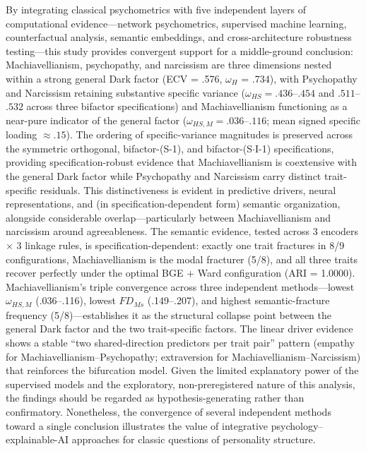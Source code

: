 \documentclass[11pt,twocolumn]{article}
\begin{document}
By integrating classical psychometrics with five independent layers of computational evidence---network psychometrics, supervised machine learning, counterfactual analysis, semantic embeddings, and cross-architecture robustness testing---this study provides convergent support for a middle-ground conclusion: Machiavellianism, psychopathy, and narcissism are three dimensions nested within a strong general Dark factor (ECV = .576, $\omega_H$ = .734), with Psychopathy and Narcissism retaining substantive specific variance ($\omega_{HS} = .436$--$.454$ and $.511$--$.532$ across three bifactor specifications) and Machiavellianism functioning as a near-pure indicator of the general factor ($\omega_{HS,M} = .036$--$.116$; mean signed specific loading $\approx .15$). The ordering of specific-variance magnitudes is preserved across the symmetric orthogonal, bifactor-(S-1), and bifactor-(S$\cdot$I-1) specifications, providing specification-robust evidence that Machiavellianism is coextensive with the general Dark factor while Psychopathy and Narcissism carry distinct trait-specific residuals. This distinctiveness is evident in predictive drivers, neural representations, and (in specification-dependent form) semantic organization, alongside considerable overlap---particularly between Machiavellianism and narcissism around agreeableness. The semantic evidence, tested across 3 encoders $\times$ 3 linkage rules, is specification-dependent: exactly one trait fractures in 8/9 configurations, Machiavellianism is the modal fracturer (5/8), and all three traits recover perfectly under the optimal BGE + Ward configuration (ARI = 1.0000). Machiavellianism's triple convergence across three independent methods---lowest $\omega_{HS,M}$ (.036--.116), lowest $FD_{Ms}$ (.149--.207), and highest semantic-fracture frequency (5/8)---establishes it as the structural collapse point between the general Dark factor and the two trait-specific factors. The linear driver evidence shows a stable ``two shared-direction predictors per trait pair'' pattern (empathy for Machiavellianism--Psychopathy; extraversion for Machiavellianism--Narcissism) that reinforces the bifurcation model. Given the limited explanatory power of the supervised models and the exploratory, non-preregistered nature of this analysis, the findings should be regarded as hypothesis-generating rather than confirmatory. Nonetheless, the convergence of several independent methods toward a single conclusion illustrates the value of integrative psychology--explainable-AI approaches for classic questions of personality structure.
\end{document}
